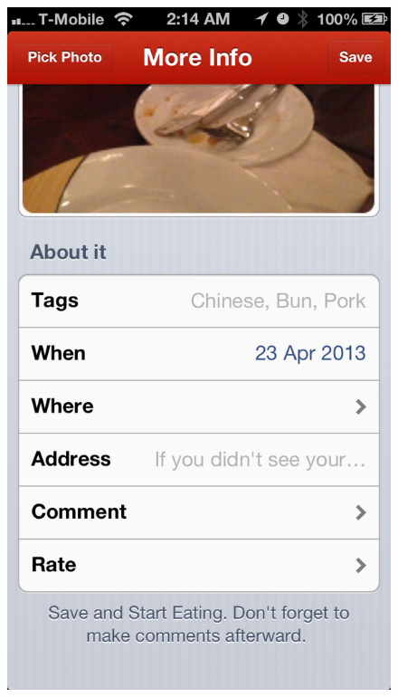 \begin{figure}
{	\includegraphics[width=\figwidth, totalheight=\figheight, keepaspectratio]{./screenshots/home-moreinfocontd.png}}   \hfill
\end{figure}
